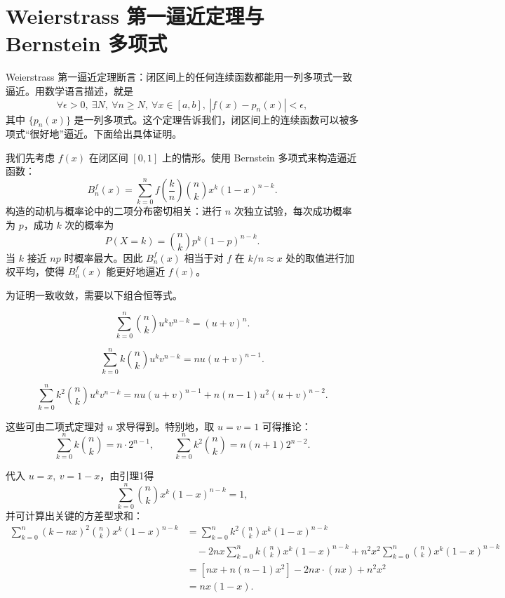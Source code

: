 \section{Weierstrass 第一逼近定理与 Bernstein 多项式}

Weierstrass 第一逼近定理断言：闭区间上的任何连续函数都能用一列多项式一致逼近。用数学语言描述，就是
\[
\forall \epsilon > 0,\ \exists N,\ \forall n \geq N,\ \forall x \in [a, b],\ |f(x) - p_n(x)| < \epsilon,
\]
其中 $\{p_n(x)\}$ 是一列多项式。这个定理告诉我们，闭区间上的连续函数可以被多项式“很好地”逼近。下面给出具体证明。

我们先考虑 $f(x)$ 在闭区间 $[0,1]$ 上的情形。使用 Bernstein 多项式来构造逼近函数：
\[
B_n^f(x) = \sum_{k=0}^{n} f\left(\frac{k}{n}\right) \binom{n}{k} x^k (1-x)^{n-k}.
\]
构造的动机与概率论中的二项分布密切相关：进行 $n$ 次独立试验，每次成功概率为 $p$，成功 $k$ 次的概率为
\[
P(X = k) = \binom{n}{k} p^k (1-p)^{n-k}.
\]
当 $k$ 接近 $np$ 时概率最大。因此 $B_n^f(x)$ 相当于对 $f$ 在 $k/n\approx x$ 处的取值进行加权平均，使得 $B_n^f(x)$ 能更好地逼近 $f(x)$。

为证明一致收敛，需要以下组合恒等式。

\begin{lemma}
\[
\sum_{k=0}^{n} \binom{n}{k} u^k v^{n-k} = (u + v)^n.
\]
\end{lemma}
\begin{lemma}
\[
\sum_{k=0}^{n} k \binom{n}{k} u^k v^{n-k} = nu(u + v)^{n-1}.
\]
\end{lemma}
\begin{lemma}
\[
\sum_{k=0}^{n} k^2 \binom{n}{k} u^k v^{n-k} = nu(u+v)^{n-1} + n(n-1)u^2(u+v)^{n-2}.
\]
\end{lemma}

这些可由二项式定理对 $u$ 求导得到。特别地，取 $u=v=1$ 可得推论：
\[
\sum_{k=0}^{n} k \binom{n}{k} = n \cdot 2^{n-1},\qquad
\sum_{k=0}^{n} k^2 \binom{n}{k} = n(n+1)2^{n-2}.
\]

代入 $u=x,\ v=1-x$，由引理1得
\[
\sum_{k=0}^{n} \binom{n}{k} x^k (1-x)^{n-k} = 1,
\]
并可计算出关键的方差型求和：
\begin{align*}
\sum_{k=0}^{n} (k-nx)^2 \binom{n}{k} x^k (1-x)^{n-k}
&= \sum_{k=0}^{n} k^2 \binom{n}{k} x^k (1-x)^{n-k} \\
&\quad - 2nx\sum_{k=0}^{n} k\binom{n}{k}x^k(1-x)^{n-k} + n^2x^2\sum_{k=0}^{n}\binom{n}{k}x^k(1-x)^{n-k} \\
&= [nx + n(n-1)x^2] - 2nx\cdot(nx) + n^2x^2 \\
&= nx(1-x).
\end{align*}

